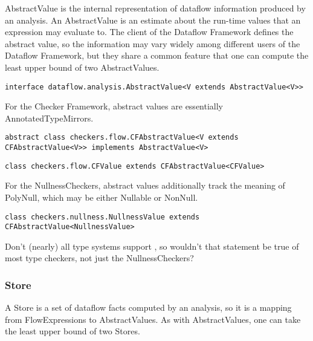     AbstractValue is the internal representation of dataflow information
    produced by an analysis.  An AbstractValue is an estimate about the
    run-time values that an expression may evaluate to.  The client of the
    Dataflow Framework defines the abstract value, so the information may
    vary widely among different users of the Dataflow Framework, but they
    share a common feature that one can compute the least upper bound of
    two AbstractValues.

        \begin{verbatim}interface dataflow.analysis.AbstractValue<V extends AbstractValue<V>>\end{verbatim}
        
    For the Checker Framework, abstract values are essentially AnnotatedTypeMirrors.
        
        \begin{verbatim}abstract class checkers.flow.CFAbstractValue<V extends CFAbstractValue<V>> implements AbstractValue<V>\end{verbatim}
        
        \begin{verbatim}class checkers.flow.CFValue extends CFAbstractValue<CFValue>\end{verbatim}
        
    For the NullnessCheckers, abstract values additionally track the meaning of PolyNull, which may be either Nullable or NonNull.
        
        \begin{verbatim}class checkers.nullness.NullnessValue extends CFAbstractValue<NullnessValue>\end{verbatim}
        
\begin{workinprogress}    
Don't (nearly) all type systems support , so wouldn't that
statement be true of most type checkers, not just the NullnessCheckers?
\end{workinprogress}



\subsubsection{Store}
\label{sec:store_classes}

    A Store is a set of dataflow facts computed by an analysis, so it is a mapping from FlowExpressions to AbstractValues.  As with AbstractValues, one can take the least upper bound of two Stores.

